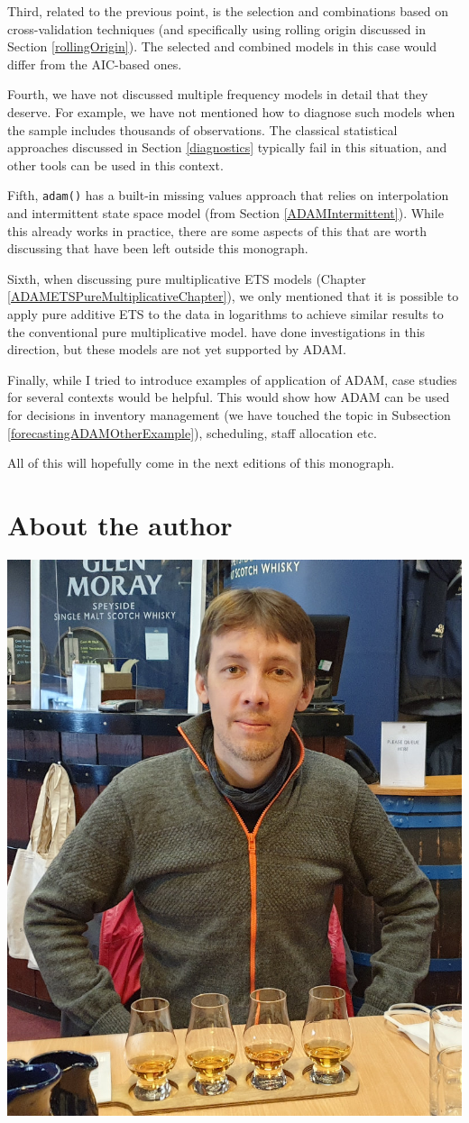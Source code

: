 \documentclass[
]{book}
\theoremstyle{definition}
\theoremstyle{definition}
\theoremstyle{definition}
\theoremstyle{definition}
\theoremstyle{remark}
\begin{document}
Third, related to the previous point, is the selection and combinations based on cross-validation techniques (and specifically using rolling origin discussed in Section \ref{rollingOrigin}). The selected and combined models in this case would differ from the AIC-based ones.

Fourth, we have not discussed multiple frequency models in detail that they deserve. For example, we have not mentioned how to diagnose such models when the sample includes thousands of observations. The classical statistical approaches discussed in Section \ref{diagnostics} typically fail in this situation, and other tools can be used in this context.

Fifth, \texttt{adam()} has a built-in missing values approach that relies on interpolation and intermittent state space model (from Section \ref{ADAMIntermittent}). While this already works in practice, there are some aspects of this that are worth discussing that have been left outside this monograph.

Sixth, when discussing pure multiplicative ETS models (Chapter \ref{ADAMETSPureMultiplicativeChapter}), we only mentioned that it is possible to apply pure additive ETS to the data in logarithms to achieve similar results to the conventional pure multiplicative model. \citet{Akram2009} have done investigations in this direction, but these models are not yet supported by ADAM.

Finally, while I tried to introduce examples of application of ADAM, case studies for several contexts would be helpful. This would show how ADAM can be used for decisions in inventory management (we have touched the topic in Subsection \ref{forecastingADAMOtherExample}), scheduling, staff allocation etc.

All of this will hopefully come in the next editions of this monograph.

\hypertarget{about-the-author}{%
\chapter*{About the author}\label{about-the-author}}

\begin{center}\includegraphics[width=0.6\linewidth]{images/IvanSvetunkov-web} \end{center}
\end{document}
